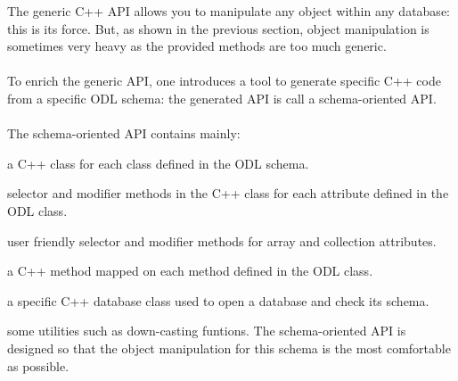 The generic C++ API allows you to manipulate any object within any
database: this is its force. But, as shown in the previous section,
object manipulation is sometimes very heavy as the provided methods
are too much generic.
\\
\\
To enrich the generic API, one introduces a tool to generate specific
C++ code from a specific ODL schema: the generated API
is call a schema-oriented API.
\\
\\
The schema-oriented API contains mainly:
\be
\item a C++ class for each class defined in the ODL schema.
\item selector and modifier methods in the C++ class
for each attribute defined in the ODL class.
\item user friendly selector and modifier methods for array and
collection attributes.
\item a C++ method mapped on each method defined in the ODL class.
\item a specific C++ database class used to open a database and
check its schema.
\item some utilities such as down-casting funtions.
\ee
The schema-oriented API is designed so that the object manipulation
for this schema is the most comfortable as possible.

